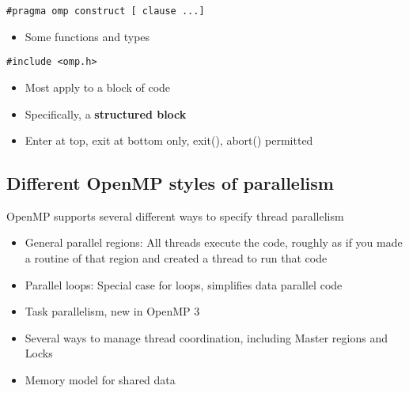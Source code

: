 \documentclass[%
oneside,                 %
final,                   %
10pt]{article}
\begin{document}
\noindent


\begin{verbatim}
#pragma omp construct [ clause ...]

\end{verbatim}

\begin{itemize}
 \item Some functions and types 
\end{itemize}

\noindent


\begin{verbatim}
#include <omp.h>

\end{verbatim}

\begin{itemize}
 \item Most apply to a block of code

 \item Specifically, a \textbf{structured block}

 \item Enter at top, exit at bottom only, exit(), abort() permitted
\end{itemize}

\noindent
\subsection*{Different OpenMP styles of parallelism}
OpenMP supports several different ways to specify thread parallelism

\begin{itemize}
\item General parallel regions: All threads execute the code, roughly as if you made a routine of that region and created a thread to run that code

\item Parallel loops: Special case for loops, simplifies data parallel code

\item Task parallelism, new in OpenMP 3

\item Several ways to manage thread coordination, including Master regions and Locks

\item Memory model for shared data
\end{itemize}
\end{document}
